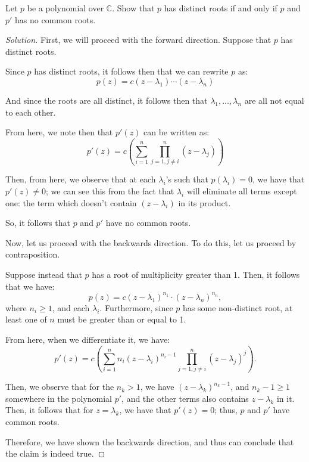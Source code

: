 \documentclass[openany]{book}
\newenvironment{solution}{\begin{proof}[Solution]}{\end{proof}}
\newcommand{\CC}{\mathbb{C}}
\begin{document}
\begin{hw}
	Let $p$ be a polynomial over $\CC$. Show that $p$ has distinct roots if and only if $p$ and $p'$ has no common roots.
\end{hw}
\begin{solution}
	First, we will proceed with the forward direction. Suppose that $p$ has distinct roots.
	
	Since $p$ has distinct roots, it follows then that we can rewrite $p$ as:
	\begin{equation*}
		p(z) = c(z- \lambda_1)\cdots(z-\lambda_n)
	\end{equation*}

	And since the roots are all distinct, it follows then that $\lambda_{1}, \ldots, \lambda_n$ are all not equal to each other.
	
	From here, we note then that $p'(z)$ can be written as:
	\begin{equation*}
		p'(z) = c\left( \sum_{i=1}^{n} \prod_{j=1, j\neq i}^{n} (z-\lambda_j) \right)
	\end{equation*}

	Then, from here, we observe that at each $\lambda_i$'s such that $p(\lambda_i) = 0$, we have that $p'(z) \neq 0$; we can see this from the fact that $\lambda_i$ will eliminate all terms except one: the term which doesn't contain $(z-\lambda_{i})$ in its product.
	
	So, it follows that $p$ and $p'$ have no common roots.
	
	Now, let us proceed with the backwards direction. To do this, let us proceed by contraposition.
	
	Suppose instead that $p$ has a root of multiplicity greater than 1. Then, it follows that we have:
	\begin{equation*}
		p(z) = c(z-\lambda_1)^{n_{1}}\cdot(z-\lambda_{n})^{n_{n}},
	\end{equation*}
	where $n_{i} \geq 1$, and each $\lambda_{i}$. Furthermore, since $p$ has some non-distinct root, at least one of $n$ must be greater than or equal to 1.

	From here, when we differentiate it, we have:
	\begin{equation*}
		p'(z) = c\left( \sum_{i=1}^{n} n_{i}(z-\lambda_i)^{n_{i} - 1}\prod_{j=1, j\neq i}^{n} (z-\lambda_j)^{j}\right).
	\end{equation*}

	Then, we observe that for the $n_{k} > 1$, we have $(z-\lambda_k)^{n_{k} - 1}$, and $n_{k} - 1 \geq 1$ somewhere in the polynomial $p'$, and the other terms also contains $z- \lambda_k$ in it. Then, it follows that for $z = \lambda_{k}$, we have that $p'(z) = 0$; thus, $p$ and $p'$ have common roots.
	
	Therefore, we have shown the backwards direction, and thus can conclude that the claim is indeed true.
\end{solution}
\end{document}
